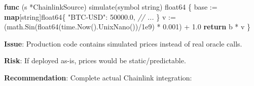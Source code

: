 \documentclass[
]{article}
\newenvironment{Shaded}{}{}
\newcommand{\CommentTok}[1]{\textcolor[rgb]{0.38,0.63,0.69}{\textit{#1}}}
\newcommand{\ControlFlowTok}[1]{\textcolor[rgb]{0.00,0.44,0.13}{\textbf{#1}}}
\newcommand{\DataTypeTok}[1]{\textcolor[rgb]{0.56,0.13,0.00}{#1}}
\newcommand{\FloatTok}[1]{\textcolor[rgb]{0.25,0.63,0.44}{#1}}
\newcommand{\KeywordTok}[1]{\textcolor[rgb]{0.00,0.44,0.13}{\textbf{#1}}}
\newcommand{\NormalTok}[1]{#1}
\newcommand{\OperatorTok}[1]{\textcolor[rgb]{0.40,0.40,0.40}{#1}}
\newcommand{\StringTok}[1]{\textcolor[rgb]{0.25,0.44,0.63}{#1}}
\begin{document}
\begin{Shaded}
\begin{Highlighting}[]
\KeywordTok{func} \OperatorTok{(}\NormalTok{s }\OperatorTok{*}\NormalTok{ChainlinkSource}\OperatorTok{)}\NormalTok{ simulate}\OperatorTok{(}\NormalTok{symbol }\DataTypeTok{string}\OperatorTok{)} \DataTypeTok{float64} \OperatorTok{\{}
\NormalTok{    base }\OperatorTok{:=} \KeywordTok{map}\OperatorTok{[}\DataTypeTok{string}\OperatorTok{]}\DataTypeTok{float64}\OperatorTok{\{}
        \StringTok{"BTC{-}USD"}\OperatorTok{:}  \FloatTok{50000.0}\OperatorTok{,}
        \CommentTok{// ...}
    \OperatorTok{\}}
\NormalTok{    v }\OperatorTok{:=} \OperatorTok{(}\NormalTok{math}\OperatorTok{.}\NormalTok{Sin}\OperatorTok{(}\DataTypeTok{float64}\OperatorTok{(}\NormalTok{time}\OperatorTok{.}\NormalTok{Now}\OperatorTok{().}\NormalTok{UnixNano}\OperatorTok{())/}\FloatTok{1e9}\OperatorTok{)} \OperatorTok{*} \FloatTok{0.001}\OperatorTok{)} \OperatorTok{+} \FloatTok{1.0}
    \ControlFlowTok{return}\NormalTok{ b }\OperatorTok{*}\NormalTok{ v}
\OperatorTok{\}}
\end{Highlighting}
\end{Shaded}

\textbf{Issue}: Production code contains simulated prices instead of
real oracle calls.

\textbf{Risk}: If deployed as-is, prices would be static/predictable.

\textbf{Recommendation}: Complete actual Chainlink integration:
\end{document}
